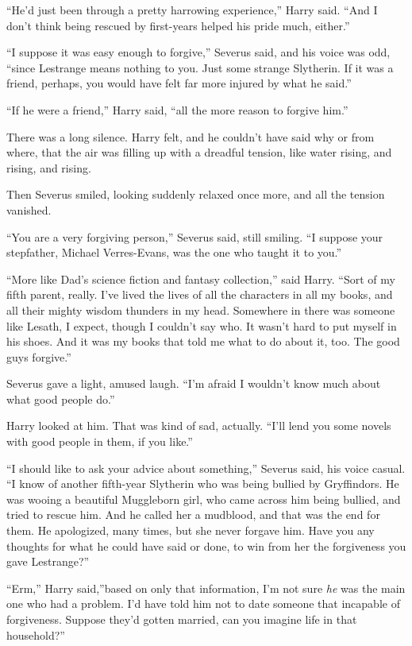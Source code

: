 ``He'd just been through a pretty harrowing experience,'' Harry said.
``And I don't think being rescued by first-years helped his pride much,
either.''

``I suppose it was easy enough to forgive,'' Severus said, and his voice
was odd, ``since Lestrange means nothing to you. Just some strange
Slytherin. If it was a friend, perhaps, you would have felt far more
injured by what he said.''

``If he were a friend,'' Harry said, ``all the more reason to forgive
him.''

There was a long silence. Harry felt, and he couldn't have said why or
from where, that the air was filling up with a dreadful tension, like
water rising, and rising, and rising.

Then Severus smiled, looking suddenly relaxed once more, and all the
tension vanished.

``You are a very forgiving person,'' Severus said, still smiling. ``I
suppose your stepfather, Michael Verres-Evans, was the one who taught it
to you.''

``More like Dad's science fiction and fantasy collection,'' said Harry.
``Sort of my fifth parent, really. I've lived the lives of all the
characters in all my books, and all their mighty wisdom thunders in my
head. Somewhere in there was someone like Lesath, I expect, though I
couldn't say who. It wasn't hard to put myself in his shoes. And it was
my books that told me what to do about it, too. The good guys forgive.''

Severus gave a light, amused laugh. ``I'm afraid I wouldn't know much
about what good people do.''

Harry looked at him. That was kind of sad, actually. ``I'll lend you
some novels with good people in them, if you like.''

``I should like to ask your advice about something,'' Severus said, his
voice casual. ``I know of another fifth-year Slytherin who was being
bullied by Gryffindors. He was wooing a beautiful Muggleborn girl, who
came across him being bullied, and tried to rescue him. And he called
her a mudblood, and that was the end for them. He apologized, many
times, but she never forgave him. Have you any thoughts for what he
could have said or done, to win from her the forgiveness you gave
Lestrange?''

``Erm,'' Harry said,''based on only that information, I'm not sure
\emph{he} was the main one who had a problem. I'd have told him not to
date someone that incapable of forgiveness. Suppose they'd gotten
married, can you imagine life in that household?''

